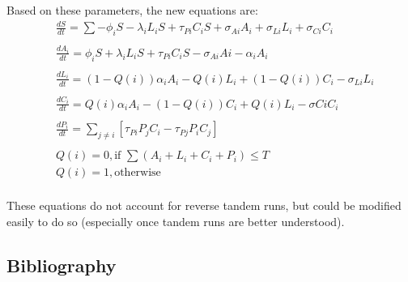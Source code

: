 \documentclass[letterpaper]{article}
\begin{document}
Based on these parameters, the new equations are:
\begin{equation}
\begin{aligned}
  & \frac{dS}{dt}   = \sum {-\phi_iS - \lambda_iL_iS + \tau_{Pi}C_iS + \sigma_{Ai}A_i + \sigma_{Li}L_i + \sigma_{Ci}C_i} \\\\
  & \frac{dA_i}{dt} = \phi_iS + \lambda_iL_iS + \tau_{Pi}C_iS - \sigma_{Ai}Ai - \alpha_iA_i \\\\
  & \frac{dL_i}{dt} = (1-Q(i))\alpha_iA_i - Q(i)L_i + (1 - Q(i))C_i - \sigma_{Li}L_i \\\\
  & \frac{dC_i}{dt} = Q(i)\alpha_iA_i - (1 - Q(i))C_i + Q(i)L_i - \sigma{Ci}C_i \\\\
  & \frac{dP_i}{dt} = \sum_{j \neq i} [\tau_{Pi}P_jC_i - \tau_{Pj}P_iC_j]\\\\
  & Q(i) = 0, \text{if    } \sum (A_i + L_i + C_i + P_i) \leq T \\
  & Q(i) = 1, \text{otherwise} \\
\end{aligned}
\end{equation}

These equations do not account for reverse tandem runs, but could be modified easily to do so (especially once tandem runs are better understood).

  \subsection{Bibliography}
      

\footnotesize


\end{document}
